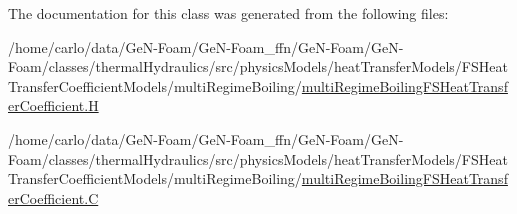 The documentation for this class was generated from the following files\+:\begin{DoxyCompactItemize}
\item 
/home/carlo/data/\+Ge\+N-\/\+Foam/\+Ge\+N-\/\+Foam\+\_\+ffn/\+Ge\+N-\/\+Foam/\+Ge\+N-\/\+Foam/classes/thermal\+Hydraulics/src/physics\+Models/heat\+Transfer\+Models/\+F\+S\+Heat\+Transfer\+Coefficient\+Models/multi\+Regime\+Boiling/\hyperlink{multiRegimeBoilingFSHeatTransferCoefficient_8H}{multi\+Regime\+Boiling\+F\+S\+Heat\+Transfer\+Coefficient.\+H}\item 
/home/carlo/data/\+Ge\+N-\/\+Foam/\+Ge\+N-\/\+Foam\+\_\+ffn/\+Ge\+N-\/\+Foam/\+Ge\+N-\/\+Foam/classes/thermal\+Hydraulics/src/physics\+Models/heat\+Transfer\+Models/\+F\+S\+Heat\+Transfer\+Coefficient\+Models/multi\+Regime\+Boiling/\hyperlink{multiRegimeBoilingFSHeatTransferCoefficient_8C}{multi\+Regime\+Boiling\+F\+S\+Heat\+Transfer\+Coefficient.\+C}\end{DoxyCompactItemize}
